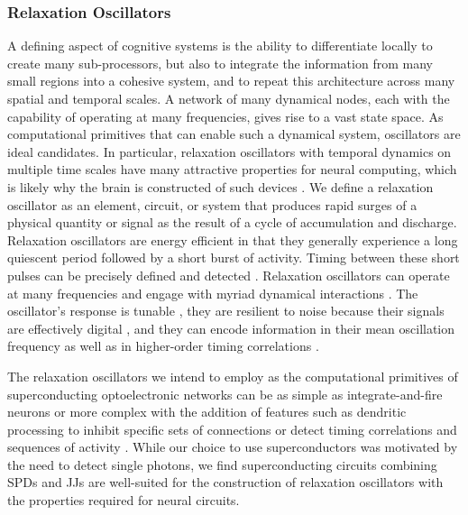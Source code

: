 \documentclass[twocolumn]{article}
\begin{document}
\subsubsection{Relaxation Oscillators}
A defining aspect of cognitive systems is the ability to differentiate locally to create many sub-processors, but also to integrate the information from many small regions into a cohesive system, and to repeat this architecture across many spatial and temporal scales. A network of many dynamical nodes, each with the capability of operating at many frequencies, gives rise to a vast state space. As computational primitives that can enable such a dynamical system, oscillators are ideal candidates. In particular, relaxation oscillators \cite{st2015,mist1990,soko1993,lued1997,huya2000,bu2006,gile2011,vepe1968,cacl1981} with temporal dynamics on multiple time scales \cite{soko1993} have many attractive properties for neural computing, which is likely why the brain is constructed of such devices \cite{ll1988}. We define a relaxation oscillator as an element, circuit, or system that produces rapid surges of a physical quantity or signal as the result of a cycle of accumulation and discharge. Relaxation oscillators are energy efficient in that they generally experience a long quiescent period followed by a short burst of activity. Timing between these short pulses can be precisely defined and detected \cite{bu2006}. Relaxation oscillators can operate at many frequencies \cite{huya2000} and engage with myriad dynamical interactions \cite{lued1997}. The oscillator's response is tunable \cite{huya2000}, they are resilient to noise because their signals are effectively digital \cite{stgo2005}, and they can encode information in their mean oscillation frequency as well as in higher-order timing correlations \cite{pasc1999,thde2001,sase2001,stse2007,brcl2010,haah2015}.

The relaxation oscillators we intend to employ as the computational primitives of superconducting optoelectronic networks can be as simple as integrate-and-fire neurons \cite{daab2001,geki2002} or more complex with the addition of features such as dendritic processing \cite{thde2001,sase2001,stse2007,brcl2010,haah2015} to inhibit specific sets of connections \cite{budr2004,bu2006,robu2015} or detect timing correlations and sequences of activity \cite{sase2001,haah2015}. While our choice to use superconductors was motivated by the need to detect single photons, we find superconducting circuits combining SPDs and JJs are well-suited for the construction of relaxation oscillators with the properties required for neural circuits.
\end{document}
